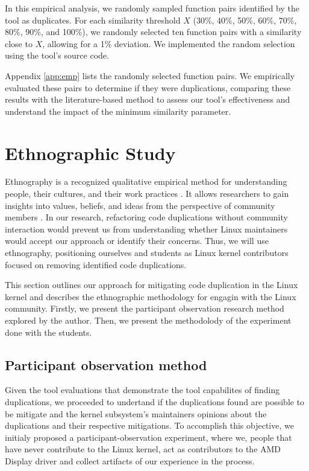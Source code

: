 In this empirical analysis, we randomly sampled function pairs identified by the tool as duplicates. For each similarity threshold \(X\) (30\%, 40\%, 50\%, 60\%, 70\%, 80\%, 90\%, and 100\%), we randomly selected ten function pairs with a similarity close to \(X\), allowing for a 1\% deviation. We implemented the random selection using the tool's source code.

Appendix \ref{app:emp} lists the randomly selected function pairs. We empirically evaluated these pairs to determine if they were duplications, comparing these results with the literature-based method to assess our tool's effectiveness and understand the impact of the minimum similarity parameter.


\section{Ethnographic Study}

\label{sec:meteth}

Ethnography is a recognized qualitative empirical method for understanding people, 
their cultures, and their work practices \citep{bookethno}. It allows researchers 
to gain insights into values, beliefs, and ideas from the perspective of community 
members \citep{ethnosoft}. In our research, refactoring code duplications without 
community interaction would prevent us from understanding whether Linux maintainers 
would accept our approach or identify their concerns. Thus, we will use ethnography, 
positioning ourselves and students as Linux kernel contributors focused on removing 
identified  code duplications.

This section outlines our approach for mitigating code duplication in the Linux kernel
and describes the ethnographic methodology for engagin with the Linux community. Firstly, 
we present the participant observation research method explored by the author. Then, 
we present the methodolody of the experiment done with the students.

\subsection{Participant observation method}

Given the tool evaluations that demonstrate the tool capabilites of finding duplications, 
we proceeded to undertand if the duplications found are possible to be mitigate and
the kernel subsystem's maintainers opinions about the duplications and their respective mitigations.
To accomplish this objective, we initialy proposed a participant-observation experiment, 
where we, people that have never contribute to the Linux kernel, 
act as contributors to the AMD Display driver and collect artifacts of our experience in the process.

